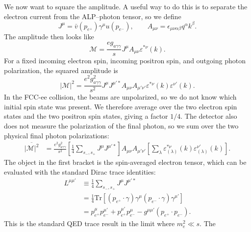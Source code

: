 \documentclass[12pt,a4paper]{article}
\begin{document}
We now want to square the amplitude. A useful way to do this is to separate
the electron current from the ALP--photon tensor, so we define
\begin{equation}
    J^\mu=\bar v(p_{e^+})\gamma^\mu u(p_{e^-}),
    \qquad
    A_{\mu\nu}=\epsilon_{\mu\nu\alpha\beta}q^\alpha k^\beta .
\end{equation}
The amplitude then looks like
\begin{equation}
    \mathcal{M}
    =
    \frac{eg_{a\gamma\gamma}}{s}J^\mu A_{\mu\nu}\varepsilon^{*\nu}(k).
\end{equation}
For a fixed incoming electron spin, incoming positron spin, and outgoing
photon polarization, the squared amplitude is
\begin{equation}
    |\mathcal{M}|^2
    =
    \frac{e^2g_{a\gamma\gamma}^2}{s^2}
    J^\mu J^{\mu' *}
    A_{\mu\nu}A_{\mu'\nu'}
    \varepsilon^{*\nu}(k)\varepsilon^{\nu'}(k).
    \label{eq:prod_m2_fixed}
\end{equation}
In the FCC-ee collision, the beams are unpolarized, so we do not know which
initial spin state was present. We therefore average over the two electron
spin states and the two positron spin states, giving a factor $1/4$. The
detector also does not measure the polarization of the final photon, so we sum
over the two physical final photon polarizations:
\begin{align}
    \overline{|\mathcal{M}|^2}
    &=
    \frac{e^2g_{a\gamma\gamma}^2}{s^2}
    \left[
      \frac{1}{4}
      \sum_{s_-,s_+}
      J^\mu J^{\mu' *}
    \right]
    A_{\mu\nu}A_{\mu'\nu'}
    \left[
      \sum_\lambda
      \varepsilon^{*\nu}_{(\lambda)}(k)
      \varepsilon^{\nu'}_{(\lambda)}(k)
    \right].
    \label{eq:prod_m2_sums}
\end{align}
The object in the first bracket is the spin-averaged electron tensor, which
can be evaluated with the standard Dirac trace identities:
\begin{align}
    L^{\mu\mu'}
    &\equiv
    \frac{1}{4}
    \sum_{s_-,s_+}
    J^\mu J^{\mu' *}
    \nonumber\\
    &=
    \frac{1}{4}
    \mathrm{Tr}\!\left[
      (p_{e^+}\!\cdot\gamma)\gamma^\mu
      (p_{e^-}\!\cdot\gamma)\gamma^{\mu'}
    \right] \nonumber\\
    &=
    p_{e^+}^{\mu}p_{e^-}^{\mu'}
    +
    p_{e^+}^{\mu'}p_{e^-}^{\mu}
    -
    g^{\mu\mu'}(p_{e^+}\cdot p_{e^-}).
    \label{eq:leptonic_tensor}
\end{align}
This is the standard QED trace result in the limit where $m_e^2\ll s$. The
\end{document}
